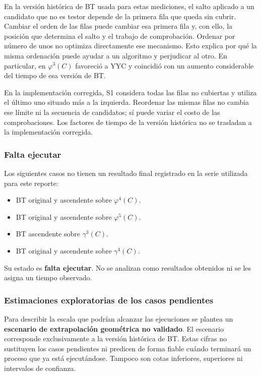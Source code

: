 En la versión histórica de BT usada para estas mediciones, el salto
aplicado a un candidato que no es testor depende
de la primera fila que queda sin cubrir. Cambiar el orden de las
filas puede cambiar esa primera fila y, con ello, la posición que
determina el salto y el trabajo de comprobación. Ordenar por número
de unos no optimiza directamente ese mecanismo. Esto explica por
qué la misma ordenación puede ayudar a un algoritmo y perjudicar
al otro. En particular, en $\varphi^3(C)$ favoreció a YYC y coincidió
con un aumento considerable del tiempo de esa versión de BT.

En la implementación corregida, S1 considera todas las filas no cubiertas
y utiliza el último uno situado más a la izquierda. Reordenar las mismas
filas no cambia ese límite ni la secuencia de candidatos; sí puede variar
el costo de las comprobaciones. Los factores de tiempo de la versión
histórica no se trasladan a la implementación corregida.

\subsubsection*{Falta ejecutar}

Los siguientes casos no tienen un resultado final registrado en
la serie utilizada para este reporte:
\begin{itemize}[nosep]
\item BT original y ascendente sobre $\varphi^4(C)$.
\item BT original y ascendente sobre $\varphi^5(C)$.
\item BT ascendente sobre $\gamma^3(C)$.
\item BT original y ascendente sobre $\gamma^4(C)$.
\end{itemize}
Su estado es \textbf{falta ejecutar}. No se analizan como resultados
obtenidos ni se les asigna un tiempo observado.

\subsubsection*{Estimaciones exploratorias de los casos pendientes}

Para describir la escala que podrían alcanzar las ejecuciones se
plantea un \textbf{escenario de extrapolación geométrica no validado}.
El escenario corresponde exclusivamente a la versión histórica de BT.
Estas cifras no sustituyen los casos pendientes ni predicen de forma
fiable cuándo terminará un proceso que ya está ejecutándose. Tampoco
son cotas inferiores, superiores ni intervalos de confianza.

